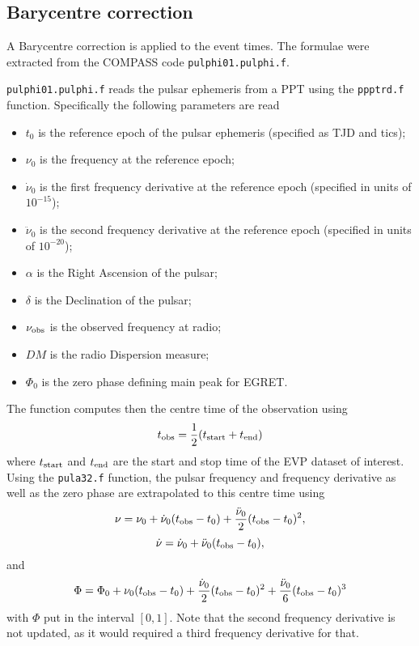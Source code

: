 \documentclass{article}[12pt,a4]
\begin{document}
\subsection{Barycentre correction}

A Barycentre correction is applied to the event times. The formulae were extracted from the COMPASS
code {\tt pulphi01.pulphi.f}.

{\tt pulphi01.pulphi.f} reads the pulsar ephemeris from a PPT using the {\tt ppptrd.f} function. Specifically
the following parameters are read
\begin{itemize}
\item $t_0$ is the reference epoch of the pulsar ephemeris (specified as TJD and tics);
\item $\nu_0$ is the frequency at the reference epoch;
\item $\dot{\nu}_0$ is the first frequency derivative at the reference epoch (specified in units of $10^{-15}$);
\item $\ddot{\nu}_0$ is the second frequency derivative at the reference epoch (specified in units of $10^{-20}$);
\item $\alpha$ is the Right Ascension of the pulsar;
\item $\delta$ is the Declination of the pulsar;
\item $\nu_{\rm obs}$ is the observed frequency at radio;
\item $DM$ is the radio Dispersion measure;
\item $\Phi_0$ is the zero phase defining main peak for EGRET.
\end{itemize}

The function computes then the centre time of the observation using
\begin{equation}
t_{\rm obs} = \frac{1}{2} (t_{\rm start} + t_{\rm end})
\end{equation}
where $t_{\rm start}$ and $t_{\rm end}$ are the start and stop time of the EVP dataset of
interest. 
Using the {\tt pula32.f} function, the pulsar frequency and frequency derivative as well as the zero phase
are extrapolated to this centre time using
\begin{equation}
\nu = \nu_0 + \dot{\nu}_0 (t_{\rm obs} - t_0)  + \frac{\ddot{\nu}_0}{2} (t_{\rm obs} - t_0)^2 ,
\end{equation}
\begin{equation}
\dot{\nu} = \dot{\nu}_0 + \ddot{\nu}_0 (t_{\rm obs} - t_0) ,
\end{equation}
and
\begin{equation}
\Phi = \Phi_0 + \nu_0 (t_{\rm obs} - t_0) + \frac{\dot{\nu}_0}{2} (t_{\rm obs} - t_0)^2 + \frac{\ddot{\nu}_0}{6} (t_{\rm obs} - t_0)^3
\label{eq:phase-ephemeris}
\end{equation}
with $\Phi$ put in the interval $[0,1]$.
Note that the second frequency derivative is not updated, as it would required a third frequency derivative for
that.
\end{document}
